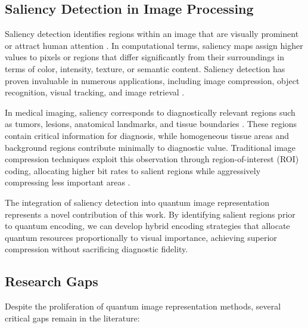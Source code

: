 \documentclass[pdflatex,sn-mathphys-num,Numbered]{sn-jnl}
\theoremstyle{thmstyleone}
\theoremstyle{thmstyletwo}
\theoremstyle{thmstylethree}
\begin{document}
\subsection{Saliency Detection in Image Processing}

Saliency detection identifies regions within an image that are visually prominent or attract human attention \cite{bib26,bib27,bib28,bib29,bib30,bib31}. In computational terms, saliency maps assign higher values to pixels or regions that differ significantly from their surroundings in terms of color, intensity, texture, or semantic content. Saliency detection has proven invaluable in numerous applications, including image compression, object recognition, visual tracking, and image retrieval \cite{bib32,bib33,bib34,bib35}.

In medical imaging, saliency corresponds to diagnostically relevant regions such as tumors, lesions, anatomical landmarks, and tissue boundaries \cite{bib36,bib37,bib38,bib39,bib40}. These regions contain critical information for diagnosis, while homogeneous tissue areas and background regions contribute minimally to diagnostic value. Traditional image compression techniques exploit this observation through region-of-interest (ROI) coding, allocating higher bit rates to salient regions while aggressively compressing less important areas \cite{bib41}.

The integration of saliency detection into quantum image representation represents a novel contribution of this work. By identifying salient regions prior to quantum encoding, we can develop hybrid encoding strategies that allocate quantum resources proportionally to visual importance, achieving superior compression without sacrificing diagnostic fidelity.

\subsection{Research Gaps}

Despite the proliferation of quantum image representation methods, several critical gaps remain in the literature:
\end{document}
